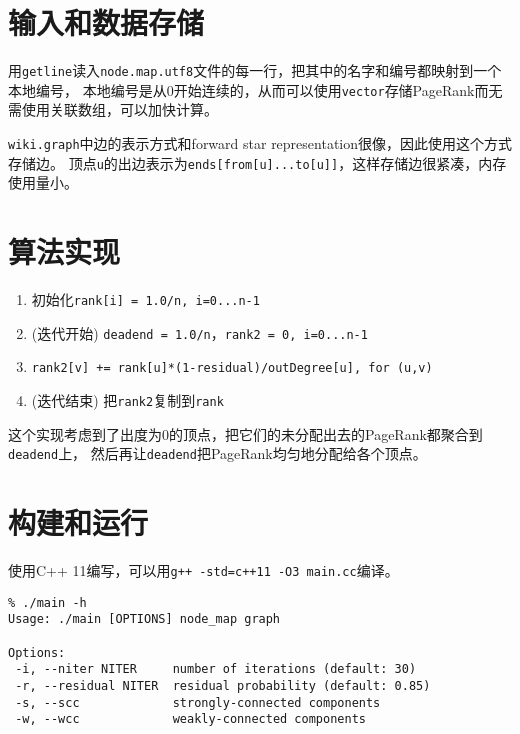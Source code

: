 \title{}
\author{MaskRay}
\maketitle

\section{输入和数据存储}

用\texttt{getline}读入\texttt{node.map.utf8}文件的每一行，把其中的名字和编号都映射到一个本地编号，
本地编号是从0开始连续的，从而可以使用\texttt{vector}存储PageRank而无需使用关联数组，可以加快计算。

\texttt{wiki.graph}中边的表示方式和forward star representation很像，因此使用这个方式存储边。
顶点\texttt{u}的出边表示为\texttt{ends[from[u]...to[u]]}，这样存储边很紧凑，内存使用量小。

\section{算法实现}

\begin{enumerate}
  \item 初始化\texttt{rank[i] = 1.0/n, i=0...n-1}
  \item (迭代开始) \texttt{deadend = 1.0/n}，\texttt{rank2 = 0, i=0...n-1}
  \item \texttt{rank2[v] += rank[u]*(1-residual)/outDegree[u], for (u,v)}
  \item (迭代结束) 把\texttt{rank2}复制到\texttt{rank}
\end{enumerate}

这个实现考虑到了出度为0的顶点，把它们的未分配出去的PageRank都聚合到\texttt{deadend}上，
然后再让\texttt{deadend}把PageRank均匀地分配给各个顶点。

\section{构建和运行}

使用C++ 11编写，可以用\texttt{g++ -std=c++11 -O3 main.cc}编译。

\begin{verbatim}
% ./main -h
Usage: ./main [OPTIONS] node_map graph

Options:
 -i, --niter NITER     number of iterations (default: 30)
 -r, --residual NITER  residual probability (default: 0.85)
 -s, --scc             strongly-connected components
 -w, --wcc             weakly-connected components
\end{verbatim}

